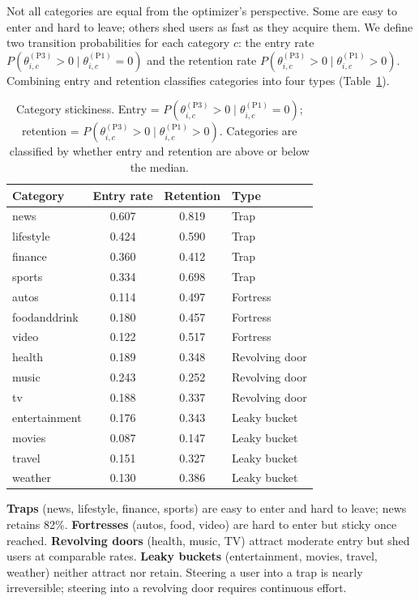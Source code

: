 \documentclass[11pt]{article}
\begin{document}
Not all categories are equal from the optimizer's perspective. Some are easy to enter and hard to leave; others shed users as fast as they acquire them. We define two transition probabilities for each category $c$: the entry rate $P(\theta_{i,c}^{(\text{P3})} > 0 \mid \theta_{i,c}^{(\text{P1})} = 0)$ and the retention rate $P(\theta_{i,c}^{(\text{P3})} > 0 \mid \theta_{i,c}^{(\text{P1})} > 0)$. Combining entry and retention classifies categories into four types (Table~\ref{tab:stickiness}).

\begin{table}[ht]
\centering
\caption{Category stickiness. Entry = $P(\theta_{i,c}^{(\text{P3})} > 0 \mid \theta_{i,c}^{(\text{P1})} = 0)$; retention = $P(\theta_{i,c}^{(\text{P3})} > 0 \mid \theta_{i,c}^{(\text{P1})} > 0)$. Categories are classified by whether entry and retention are above or below the median.}
\label{tab:stickiness}
\begin{tabular}{lccl}
\toprule
Category & Entry rate & Retention & Type \\
\midrule
news & 0.607 & 0.819 & Trap \\
lifestyle & 0.424 & 0.590 & Trap \\
finance & 0.360 & 0.412 & Trap \\
sports & 0.334 & 0.698 & Trap \\
autos & 0.114 & 0.497 & Fortress \\
foodanddrink & 0.180 & 0.457 & Fortress \\
video & 0.122 & 0.517 & Fortress \\
health & 0.189 & 0.348 & Revolving door \\
music & 0.243 & 0.252 & Revolving door \\
tv & 0.188 & 0.337 & Revolving door \\
entertainment & 0.176 & 0.343 & Leaky bucket \\
movies & 0.087 & 0.147 & Leaky bucket \\
travel & 0.151 & 0.327 & Leaky bucket \\
weather & 0.130 & 0.386 & Leaky bucket \\
\bottomrule
\end{tabular}
\end{table}
\FloatBarrier

\textbf{Traps} (news, lifestyle, finance, sports) are easy to enter and hard to leave; news retains 82\%. \textbf{Fortresses} (autos, food, video) are hard to enter but sticky once reached. \textbf{Revolving doors} (health, music, TV) attract moderate entry but shed users at comparable rates. \textbf{Leaky buckets} (entertainment, movies, travel, weather) neither attract nor retain. Steering a user into a trap is nearly irreversible; steering into a revolving door requires continuous effort.
\end{document}
